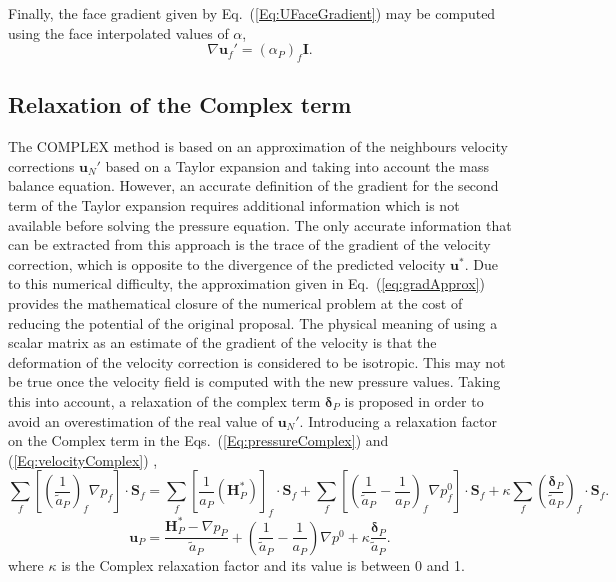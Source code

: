 \documentclass[final,3p,times,11pt,onecolumn]{myElsarticle}
\numberwithin{equation}{section}
\begin{document}
Finally, the face gradient given by Eq.~(\ref{Eq:UFaceGradient}) may be computed using the face interpolated values of $\alpha$,
\begin{equation}
\label{Eq:scalarMatrix}
\nabla \boldsymbol{u}_f'
=
\left(
\alpha_P
\right)_f
\boldsymbol{I}.
\end{equation}

\subsection{Relaxation of the Complex term}
The COMPLEX method is based on an approximation of the neighbours velocity corrections $\boldsymbol{u}_N'$ based on a Taylor expansion and taking into account the mass balance equation. However, an accurate definition of the gradient for the second term of the Taylor expansion requires additional information which is not available before solving the pressure equation. The only accurate information that can be extracted from this approach is the trace of the gradient of the velocity correction, which is opposite to the divergence of the predicted velocity $\boldsymbol{u}^*$. Due to this numerical difficulty, the approximation given in Eq.~(\ref{eq:gradApprox}) provides the mathematical closure of the numerical problem at the cost of reducing the potential of the original proposal. The physical meaning of using a scalar matrix as an estimate of the gradient of the velocity is that the deformation of the velocity correction is considered to be isotropic. This may not be true once the velocity field is computed with the new pressure values. Taking this into account, a relaxation of the complex term $\boldsymbol{\delta}_P$ is proposed in order to avoid an overestimation of the real value of $\boldsymbol{u}_N'$. Introducing a relaxation factor on the Complex term in the Eqs.~(\ref{Eq:pressureComplex}) and (\ref{Eq:velocityComplex}) , 
\begin{equation}
\label{Eq:pressureComplexRelaxed}
\sum_f
\left[
\left(
\dfrac
{1}
{\tilde{a}_P}
\right)_f
\nabla p_f
\right]
\cdot 
\boldsymbol{S}_f
= 
\sum_f 
\left[
\frac{1}{a_P}
\left(
\boldsymbol{H}_P^*
\right)
\right]_f 
\cdot
\boldsymbol{S}_f
+
\sum_f
\left[
\left(
\dfrac
{1}
{\tilde{a}_P}
-
\dfrac
{1}
{a_P}
\right)_f
\nabla p^{0}_f
\right]
\cdot
\boldsymbol{S}_f
+
\kappa
\sum_f
\left(
\dfrac{\boldsymbol{\delta}_P}{\tilde{a}_P}
\right)_f
\cdot
\boldsymbol{S}_f.
\end{equation}
\begin{equation}
\label{Eq:velocityComplexRelaxed}
\boldsymbol{u}_P 
=
\dfrac
{
\boldsymbol{H}_P^*
- 
\nabla p_P}
{\tilde{a}_P}
+
\left(
\dfrac{1}
{\tilde{a}_P}
-
\dfrac{1}
{a_P}
\right)
\nabla p^{0}
+
\kappa
\dfrac{\boldsymbol{\delta}_P}
{\tilde{a}_P}.
\end{equation}
where $\kappa$ is the Complex relaxation factor and its value is between 0 and 1.
\end{document}
